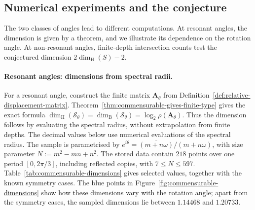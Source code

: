 \documentclass[scheme=plain]{ctexart}
\newcommand{\dimbox}{\dim_\mathrm{B}}
\newcommand{\dimhaus}{\dim_\mathrm{H}}
\begin{document}
\subsection{Numerical experiments and the conjecture}
\label{sec:conjecture}

The two classes of angles lead to different computations. At resonant angles, the dimension is given by a theorem, and we illustrate its dependence on the rotation angle. At non-resonant angles, finite-depth intersection counts test the conjectured dimension $2\dimhaus(S)-2$.

\paragraph{Resonant angles: dimensions from spectral radii.}
For a resonant angle, construct the finite matrix $\mathbf A_\theta$ from Definition~\ref{def:relative-displacement-matrix}.
Theorem~\ref{thm:commensurable-gives-finite-type} gives the exact formula $\dimhaus(\mathcal S_\theta)=\dimbox(\mathcal S_\theta)=\log_2\rho(\mathbf A_\theta)$.
Thus the dimension follows by evaluating the spectral radius, without extrapolation from finite depths.
The decimal values below use numerical evaluations of the spectral radius.
The sample is parametrised by $e^{i\theta}=\overline{(m+n\omega)}/(m+n\omega)$, with size parameter $N:=m^2-mn+n^2$.
The stored data contain $218$ points over one period $[0,2\pi/3]$, including reflected copies, with $7\le N\le597$.
Table~\ref{tab:commensurable-dimensions} gives selected values, together with the known symmetry cases.
The blue points in Figure~\ref{fig:commensurable-dimensions} show how these dimensions vary with the rotation angle; apart from the symmetry cases, the sampled dimensions lie between $1.14468$ and $1.20733$.
\end{document}
